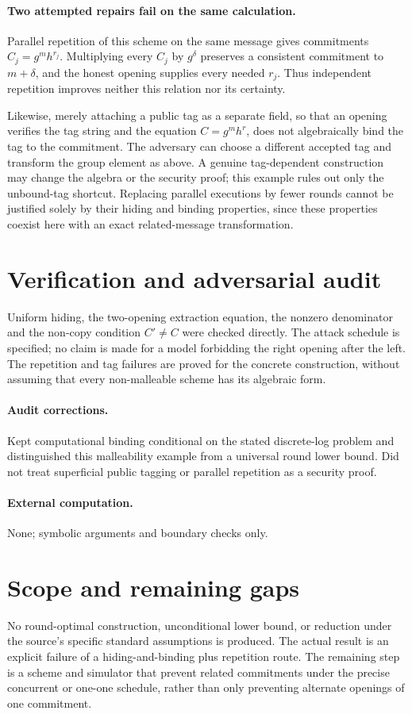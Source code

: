 \documentclass[11pt]{article}
\begin{document}
\paragraph{Two attempted repairs fail on the same calculation.}
Parallel repetition of this scheme on the same message gives commitments $C_j=g^m h^{r_j}$. Multiplying every $C_j$ by $g^\delta$ preserves a consistent commitment to $m+\delta$, and the honest opening supplies every needed $r_j$. Thus independent repetition improves neither this relation nor its certainty.

Likewise, merely attaching a public tag as a separate field, so that an opening verifies the tag string and the equation $C=g^m h^r$, does not algebraically bind the tag to the commitment. The adversary can choose a different accepted tag and transform the group element as above. A genuine tag-dependent construction may change the algebra or the security proof; this example rules out only the unbound-tag shortcut. Replacing parallel executions by fewer rounds cannot be justified solely by their hiding and binding properties, since these properties coexist here with an exact related-message transformation.
\section{Verification and adversarial audit}
Uniform hiding, the two-opening extraction equation, the nonzero denominator and the non-copy condition $C'\ne C$ were checked directly. The attack schedule is specified; no claim is made for a model forbidding the right opening after the left. The repetition and tag failures are proved for the concrete construction, without assuming that every non-malleable scheme has its algebraic form.
\paragraph{Audit corrections.} Kept computational binding conditional on the stated discrete-log problem and distinguished this malleability example from a universal round lower bound. Did not treat superficial public tagging or parallel repetition as a security proof.
\paragraph{External computation.} None; symbolic arguments and boundary checks only.
\section{Scope and remaining gaps}
No round-optimal construction, unconditional lower bound, or reduction under the source's specific standard assumptions is produced. The actual result is an explicit failure of a hiding-and-binding plus repetition route. The remaining step is a scheme and simulator that prevent related commitments under the precise concurrent or one-one schedule, rather than only preventing alternate openings of one commitment.
\end{document}

